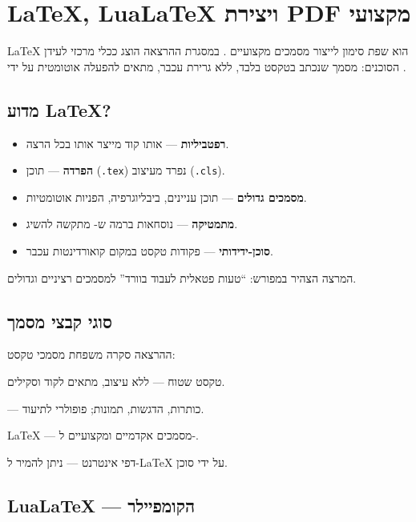 \section{LaTeX, LuaLaTeX ויצירת PDF מקצועי}

\LaTeX{} הוא שפת סימון לייצור מסמכים מקצועיים \cite{lamport1994latex}. במסגרת
ההרצאה הוצג ככלי מרכזי לעידן הסוכנים: מסמך שנכתב בטקסט בלבד, ללא גרירת
עכבר, מתאים להפעלה אוטומטית על ידי .

\subsection{מדוע LaTeX?}

\begin{itemize}[rightmargin=2em]
  \item \textbf{רפטביליות} --- אותו קוד מייצר אותו  בכל הרצה.
  \item \textbf{הפרדה} --- תוכן (\texttt{.tex}) נפרד מעיצוב (\texttt{.cls}).
  \item \textbf{מסמכים גדולים} --- תוכן עניינים, ביבליוגרפיה, הפניות אוטומטיות.
  \item \textbf{מתמטיקה} --- נוסחאות ברמה ש- מתקשה להשיג.
  \item \textbf{סוכן-ידידותי} --- פקודות טקסט במקום קואורדינטות עכבר.
\end{itemize}

המרצה הצהיר במפורש: ``טעות פטאלית לעבוד בוורד'' למסמכים רציניים וגדולים.

\subsection{סוגי קבצי מסמך}

ההרצאה סקרה משפחת מסמכי טקסט:
\begin{description}[rightmargin=2em, style=nextline]
  \item[\texttt{.txt}] טקסט שטוח --- ללא עיצוב, מתאים לקוד וסקילים.
  \item[\texttt{.md}]  --- כותרות, הדגשות, תמונות; פופולרי לתיעוד.
  \item[\texttt{.tex}] \LaTeX{} --- מסמכים אקדמיים ומקצועיים ל-.
  \item[\texttt{.html}] דפי אינטרנט --- ניתן להמיר ל-\LaTeX{} על ידי סוכן.
\end{description}

\subsection{LuaLaTeX --- הקומפיילר}

